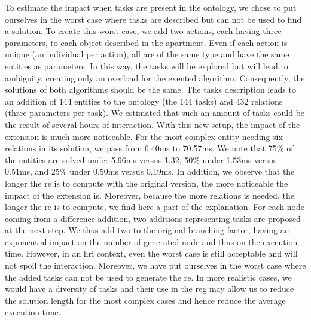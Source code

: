 To estimate the impact when tasks are present in the ontology, we chose to put ourselves in the worst case where tasks are described but can not be used to find a solution. To create this worst case, we add two actions, each having three parameters, to each object described in the apartment. Even if each action is unique (an individual per action), all are of the same type and have the same entities as parameters. In this way, the tasks will be explored but will lead to ambiguity, creating only an overload for the exented algorithm. Consequently, the solutions of both algorithms should be the same. The tasks description leads to an addition of 144 entities to the ontology (the 144 tasks) and 432 relations (three parameters per task). We estimated that such an amount of tasks could be the result of several hours of interaction. With this new setup, the impact of the extension is much more noticeable. For the most complex entity needing six relations in its solution, we pass from 6.40ms to 70.57ms. We note that 75\% of the entities are solved under 5.96ms versus 1.32, 50\% under 1.53ms versus 0.51ms, and 25\% under 0.50ms versus 0.19ms. In addition, we observe that the longer the \acrshort{re} is to compute with the original version, the more noticeable the impact of the extension is. Moreover, because the more relations is needed, the longer the \acrshort{re} is to compute, we find here a part of the explanation. For each node coming from a difference addition, two additions representing tasks are proposed at the next step. We thus add two to the original branching factor, having an exponential impact on the number of generated node and thus on the execution time. However, in an \acrshort{hri} context, even the worst case is still acceptable and will not spoil the interaction. Moreover, we have put ourselves in the worst case where the added tasks can not be used to generate the \acrshort{re}. In more realistic cases, we would have a diversity of tasks and their use in the \acrshort{reg} may allow us to reduce the solution length for the most complex cases and hence reduce the average execution time.




